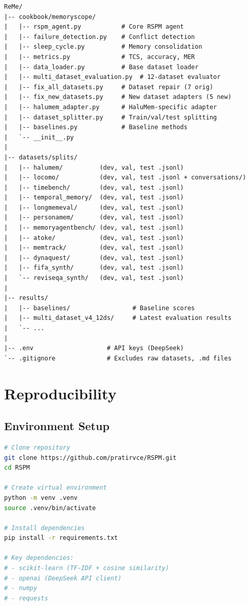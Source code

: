 \documentclass[11pt,a4paper]{article}
\begin{document}
\begin{verbatim}
ReMe/
|-- cookbook/memoryscope/
|   |-- rspm_agent.py           # Core RSPM agent
|   |-- failure_detection.py    # Conflict detection
|   |-- sleep_cycle.py          # Memory consolidation
|   |-- metrics.py              # TCS, accuracy, MER
|   |-- data_loader.py          # Base dataset loader
|   |-- multi_dataset_evaluation.py  # 12-dataset evaluator
|   |-- fix_all_datasets.py     # Dataset repair (7 orig)
|   |-- fix_new_datasets.py     # New dataset adapters (5 new)
|   |-- halumem_adapter.py      # HaluMem-specific adapter
|   |-- dataset_splitter.py     # Train/val/test splitting
|   |-- baselines.py            # Baseline methods
|   `-- __init__.py
|
|-- datasets/splits/
|   |-- halumem/          (dev, val, test .jsonl)
|   |-- locomo/           (dev, val, test .jsonl + conversations/)
|   |-- timebench/        (dev, val, test .jsonl)
|   |-- temporal_memory/  (dev, val, test .jsonl)
|   |-- longmemeval/      (dev, val, test .jsonl)
|   |-- personamem/       (dev, val, test .jsonl)
|   |-- memoryagentbench/ (dev, val, test .jsonl)
|   |-- atoke/            (dev, val, test .jsonl)
|   |-- memtrack/         (dev, val, test .jsonl)
|   |-- dynaquest/        (dev, val, test .jsonl)
|   |-- fifa_synth/       (dev, val, test .jsonl)
|   `-- reviseqa_synth/   (dev, val, test .jsonl)
|
|-- results/
|   |-- baselines/                 # Baseline scores
|   |-- multi_dataset_v4_12ds/     # Latest evaluation results
|   `-- ...
|
|-- .env                    # API keys (DeepSeek)
`-- .gitignore              # Excludes raw datasets, .md files
\end{verbatim}

\section{Reproducibility}

\subsection{Environment Setup}

\begin{lstlisting}[language=bash,frame=single]
# Clone repository
git clone https://github.com/pratirvce/RSPM.git
cd RSPM

# Create virtual environment
python -m venv .venv
source .venv/bin/activate

# Install dependencies
pip install -r requirements.txt

# Key dependencies:
# - scikit-learn (TF-IDF + cosine similarity)
# - openai (DeepSeek API client)
# - numpy
# - requests
\end{lstlisting}
\end{document}
